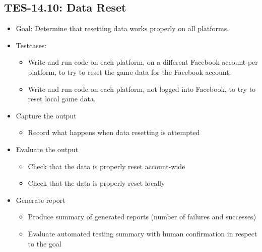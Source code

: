 \subsection{TES-14.10: Data Reset}
\label{subsec:reset}
\begin{itemize}
\item Goal: Determine that resetting data works properly on all platforms.

\item Testcases: 
\begin{itemize}
\item Write and run code on each platform, on a different Facebook account 
per platform, to try to reset the game data for the Facebook account.
\item Write and run code on each platform, not logged into Facebook, to 
try to reset local game data.
\end{itemize}

\item Capture the output 
\begin{itemize}
\item Record what happens when data resetting is attempted
\end{itemize}

\item Evaluate the output 
\begin{itemize}
\item Check that the data is properly reset account-wide
\item Check that the data is properly reset locally
\end{itemize}

\item Generate report 
\begin{itemize}
\item Produce summary of generated reports (number of failures and successes)
\item Evaluate automated testing summary with human confirmation in respect to the goal
\end{itemize}
\end{itemize}


